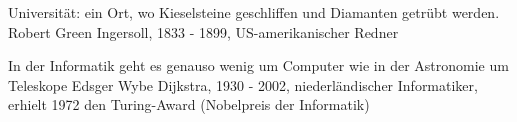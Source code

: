 {Universität: ein Ort, wo Kieselsteine geschliffen und Diamanten getrübt werden.}
{Robert Green Ingersoll, 1833 - 1899, US-amerikanischer Redner}






{In der Informatik geht es genauso wenig um Computer wie in der Astronomie um Teleskope}
{Edsger Wybe Dijkstra, 1930 - 2002, niederländischer Informatiker, erhielt 1972 den Turing-Award (Nobelpreis der Informatik)}










